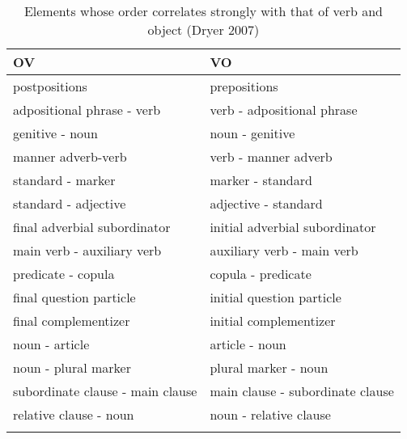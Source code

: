 \singlespacing
\begin{table}

\caption{{Elements whose order correlates strongly with that of verb and object (Dryer 2007)}}
\begin{tabular}{ l  l }
\lsptoprule
   OV & VO  \\

\midrule
 postpositions & prepositions \\

\tablevspace
 adpositional phrase - verb & verb - adpositional phrase \\

\tablevspace
 genitive - noun & noun - genitive \\

\tablevspace
 manner adverb-verb & verb - manner adverb \\

\tablevspace
 standard - marker & marker - standard \\

\tablevspace
 standard - adjective & adjective - standard \\

\tablevspace
 final adverbial subordinator & initial adverbial subordinator \\

\tablevspace
 main verb - auxiliary verb & auxiliary verb - main verb \\

\tablevspace
 predicate - copula & copula - predicate \\

\tablevspace
 final question particle & initial question particle \\

\tablevspace
 final complementizer & initial complementizer \\

\tablevspace
 noun - article & article - noun \\
 
\tablevspace
 noun - plural marker & plural marker - noun \\

\tablevspace
 subordinate clause - main clause & main clause - subordinate clause \\

\tablevspace
 relative clause - noun & noun - relative clause \\

\lspbottomrule
\end{tabular}
\label{ovvo}

\end{table}


